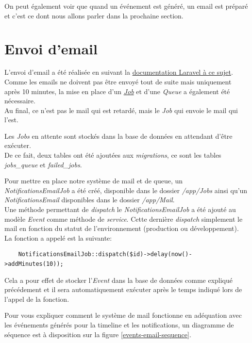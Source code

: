 \documentclass[
    iai, %
    il, %
]{heig-tb}
\begin{document}
On peut également voir que quand un événement est généré, un email est préparé et c'est ce dont nous allons parler dans la prochaine section.

\section{Envoi d'email}
L'envoi d'email a été réalisée en suivant la \href{https://laravel.com/docs/9.x/mail}{documentation Laravel à ce sujet}. \\
Comme les emails ne doivent pas être envoyé tout de suite mais uniquement après 10 minutes, la mise en place d'un \href{https://laravel.com/docs/9.x/queues#creating-jobs}{\emph{Job}} et d'une \emph{Queue} a également été nécessaire. \\
Au final, ce n'est pas le mail qui est retardé, mais le \emph{Job} qui envoie le mail qui l'est.

Les \emph{Jobs} en attente sont stockés dans la base de données en attendant d'être exécuter. \\
De ce fait, deux tables ont été ajoutées aux \emph{migrations}, ce sont les tables \emph{jobs\_queue} et \emph{failed\_jobs}.

Pour mettre en place notre système de mail et de queue, un \emph{NotificationsEmailJob} a été créé, disponible dans le dossier \emph{/app/Jobs} ainsi qu'un \emph{NotificationsEmail} disponibles dans le dossier \emph{/app/Mail}. \\
Une méthode permettant de \emph{dispatch} le \emph{NotificationsEmailJob} a été ajouté au modèle \emph{Event} comme méthode de \emph{service}. Cette dernière \emph{dispatch} simplement le mail en fonction du statut de l'environnement (production ou développement). \\
La fonction a appelé est la suivante:
\begin{lstlisting}
    NotificationsEmailJob::dispatch($id)->delay(now()->addMinutes(10));
\end{lstlisting}

Cela a pour effet de stocker l'\emph{Event} dans la base de données comme expliqué précédement et il sera automatiquement exécuter après le temps indiqué lors de l'appel de la fonction.

Pour vous expliquer comment le système de mail fonctionne en adéquation avec les événements générés pour la timeline et les notifications, un diagramme de séquence est à disposition sur la figure \ref{events-email-sequence}.
\end{document}

